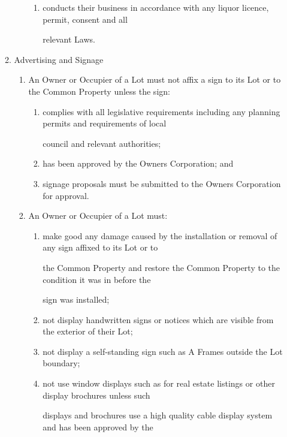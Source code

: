 \documentclass{article}
\begin{document}
\begin{enumerate}[label=\arabic*.]
\begin{enumerate}[label=\arabic{enumi}.\arabic*.]
\begin{enumerate}[label=(\arabic*)]
\begin{enumerate}[label=(\alph*)]
\item  conducts their business in accordance with any liquor licence, permit, consent and all 

relevant Laws. 

\end{enumerate}
\end{enumerate}
\item  Advertising and Signage 

\begin{enumerate}[label=(\arabic*)]
\item  An Owner or Occupier of a Lot must not affix a sign to its Lot or to the Common Property unless the sign: 

\begin{enumerate}[label=(\alph*)]
\item  complies with all legislative requirements including any planning permits and requirements of local 

council and relevant authorities; 

\item  has been approved by the Owners Corporation; and 

\item  signage proposals must be submitted to the Owners Corporation for approval. 

\end{enumerate}
\item  An Owner or Occupier of a Lot must: 

\begin{enumerate}[label=(\alph*)]
\item  make good any damage caused by the installation or removal of any sign affixed to its Lot or to 

the Common Property and restore the Common Property to the condition it was in before the 

sign was installed; 

\item  not display handwritten signs or notices which are visible from the exterior of their Lot; 

\item  not display a self-standing sign such as A Frames outside the Lot boundary; 

\item  not use window displays such as for real estate listings or other display brochures unless such 

displays and brochures use a high quality cable display system and has been approved by the 


\end{enumerate}
\end{enumerate}
\end{enumerate}
\end{enumerate}
\end{document}
